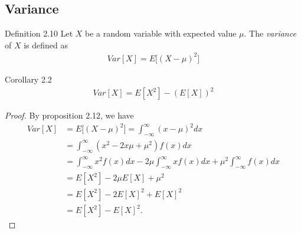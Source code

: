 \subsection{Variance}
\begin{boks}{Definition 2.10}
Let $X$ be a random variable with expected value $\mu$. The \textit{variance} of $X$ is defined as
\begin{align*}
    Var[X] = E\Big[ (X - \mu)^2 \Big]
\end{align*}
\end{boks}


\begin{boks}{Corollary 2.2}
\begin{align*}
    Var[X] = E[X^2] - (E[X])^2
\end{align*}
\end{boks}

\begin{proof}
By proposition 2.12, we have
\begin{align*}
    Var[X] &= E\Big[(X-\mu)^2\Big] = \int_{-\infty}^\infty (x - \mu)^2 dx\\
    &= \int_{-\infty}^\infty (x^2 - 2x\mu + \mu^2) f(x) dx \\
    &= \int_{-\infty}^\infty x^2 f(x) dx - 2\mu \int_{-\infty}^\infty x f(x) dx + \mu^2\int_{-\infty}^\infty f(x)dx\\
    &=E[X^2] - 2\mu E[X] + \mu^2\\
    &= E[X^2] - 2 E[X]^2 + E[X]^2\\
    &= E[X^2] - E[X]^2.
\end{align*}
\end{proof}

%
